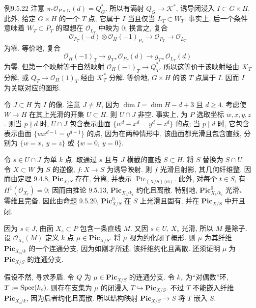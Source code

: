 \begin{origstatement}{例}{9.5.22}
注意 $\pi_*\mathcal O_{P\times G}(d)=Q_G^*$. 所以有满射 $Q_G\to\mathcal K^*$, 诱导闭浸入 $I\subset G\times H$. 此外, 给定 $G\times H$ 的一个 $T$ 点, 它属于 $I$ 当且仅当 $L_T\subset W_T$. 事实上, 后一个条件意味着 $W_T\subset P_T$ 的理想在 $\mathcal O_{L_T}$ 中映为 $0$; 换言之, 复合
\[
 \mathcal O_{P_T}(-d)\otimes\mathcal O_H(-1)_{P_T}\longrightarrow\mathcal O_{P_T}
 \longrightarrow\mathcal O_{L_T}
\]
为零. 等价地, 复合
\[
 \mathcal O_H(-1)_T\longrightarrow g_{T*}\mathcal O_{P_T}(d)
 \longrightarrow g_{T*}\mathcal O_{L_T}(d)
\]
为零. 但第一个映射等于自然映射 $\mathcal O_H(-1)_T\to Q_T^*$. 所以这等价于该映射经由 $\mathcal K_T$ 分解, 或 $Q_T\to\mathcal O_H(1)_T$ 经由 $\mathcal K_T^*$ 分解. 等价地, $G\times H$ 的该 $T$ 点属于 $I$. 因而 $I$ 为关联对应的图形.

令 $J\subset H$ 为 $I$ 的像. 注意 $J\neq H$, 因为 $\dim I=\dim H-d+3$ 且 $d\geq4$. 考虑使 $W\to H$ 在其上光滑的开集 $U\subset H$. 则 $U\cap J$ 非空. 事实上, 为 $P$ 选取坐标 $w,x,y,z$. 则当 $p\nmid d$ 时, $U\cap J$ 包含表示曲面 $\{w^d-x^d=y^d-z^d\}$ 的点; 当 $p\mid d$ 时, 它包含表示曲面 $\{wx^{d-1}=y^{d-1}\}$ 的点, 因为在两种情形中, 该曲面都光滑且包含直线, 分别为 $\{w=x,\ y=z\}$ 或 $\{w=0,\ y=0\}$.

令 $s\in U\cap J$ 为单 $k$ 点. 取通过 $s$ 且与 $J$ 横截的直线 $S\subset H$. 将 $S$ 替换为 $S\cap U$. 令 $X\subset W$ 为 $S$ 的逆像, $f:X\to S$ 为诱导映射. 则 $f$ 光滑且射影, 其几何纤维整. 因而由定理 9.4.8, $\mathbf{Pic}_{X/S}$ 存在, 分离, 并表示 $\operatorname{Pic}_{(X/S)\,\text{(\'{e}t)}}$. 此外, 对每个 $t\in S$, 有 $H^1(\mathcal O_{X_t})=0$; 因而由推论 9.5.13, $\mathbf{Pic}_{X_t/k_t}$ 约化且离散. 特别地, $\mathbf{Pic}^0_{X_t/k_t}$ 光滑、零维且完备. 因此由命题 9.5.20, $\mathbf{Pic}^0_{X/S}$ 在 $S$ 上光滑且固有, 并在 $\mathbf{Pic}_{X/S}$ 中开且闭.

因为 $s\in J$, 曲面 $X_s\subset P$ 包含一条直线 $M$. 又因 $s\in U$, $X_s$ 光滑, 所以 $M$ 是除子. 设 $\mathcal O_{X_s}(M)$ 定义 $k$ 点 $\mu\in\mathbf{Pic}_{X/S}$. 将 $\mu$ 视为约化闭子概形. 则 $\mu$ 为其纤维 $\mathbf{Pic}_{X_s/k}$ 的一个连通分支, 因为如刚才所述, 该纤维约化且离散. 还须证明 $\mu$ 为 $\mathbf{Pic}_{X/S}$ 的连通分支.

假设不然, 寻求矛盾. 令 $Q$ 为 $\mu\in\mathbf{Pic}_{X/S}$ 的连通分支. 令 $k_\varepsilon$ 为“对偶数”环, $T:=\operatorname{Spec}(k_\varepsilon)$. 则存在支集为 $\mu$ 的闭浸入 $T\hookrightarrow\mathbf{Pic}_{X/S}$. 不过 $T$ 不能嵌入纤维 $\mathbf{Pic}_{X_s/k}$, 因为后者约化且离散. 所以结构映射 $\mathbf{Pic}_{X/S}\to S$ 将 $T$ 嵌入 $S$.


\end{origstatement}
